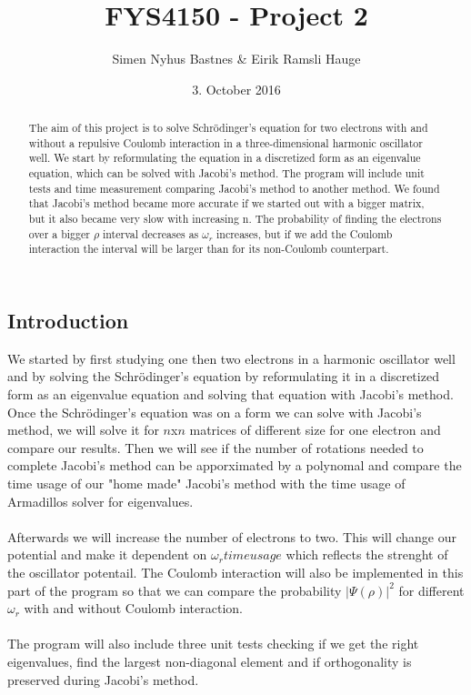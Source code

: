 \documentclass{article}
\title{FYS4150 - Project 2}
\author{Simen Nyhus Bastnes \& Eirik Ramsli Hauge}
\date{3. October 2016}
\begin{document}
\maketitle
\begin{abstract}
The aim of this project is to solve Schrödinger's equation for two electrons with and without a repulsive Coulomb interaction in a three-dimensional harmonic oscillator well. We start by reformulating the equation in a discretized form as an eigenvalue equation, which can be solved with Jacobi's method. The program will include unit tests and time measurement comparing Jacobi's method to another method. We found that Jacobi's method became more accurate if we started out with a bigger matrix, but it also became very slow with increasing n. The probability of finding the electrons over a bigger $\rho$ interval decreases as $\omega_r$ increases, but if we add the Coulomb interaction the interval will be larger than for its non-Coulomb counterpart.
\end{abstract}
\subsection{Introduction}
We started by first studying one then two electrons in a harmonic oscillator well and by solving the Schrödinger's equation by reformulating it in a discretized form as an eigenvalue equation and solving that equation with Jacobi's method. \\
Once the Schrödinger's equation was on a form we can solve with Jacobi's method, we will solve it for $n$x$n$ matrices of different size for one electron and compare our results. Then we will see if the number of rotations needed to complete Jacobi's method can be apporximated by a polynomal and compare the time usage of our "home made" Jacobi's method with the time usage of Armadillos solver for eigenvalues. \\ \\
Afterwards we will increase the number of electrons to two. This will change our potential and make it dependent on $\omega_rtime usage$ which reflects the strenght of the oscillator potentail. The Coulomb interaction will also be implemented in this part of the program so that we can compare the probability $|\Psi(\rho)|^2$ for different $\omega_r$ with and without Coulomb interaction. \\ \\
The program will also include three unit tests checking if we get the right eigenvalues, find the largest non-diagonal element and if orthogonality is preserved during Jacobi's method. 
\end{document}
